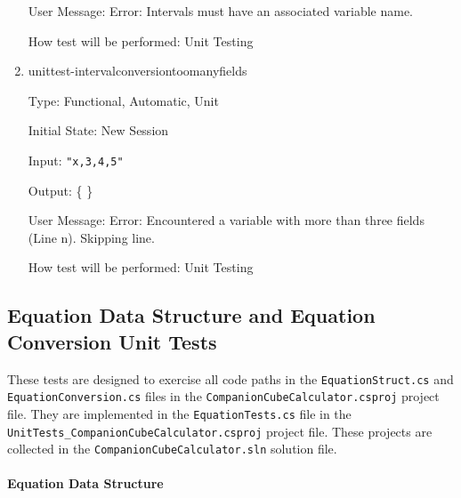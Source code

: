 \documentclass[12pt, titlepage]{article}
\begin{document}
\begin{enumerate}
	User Message: Error: Intervals must have an associated variable name.
	
	How test will be performed: Unit Testing\\
	
	\item{unittest-intervalconversiontoomanyfields}
	
	Type: Functional, Automatic, Unit
	
	Initial State: New Session
	
	Input: \texttt{"x,3,4,5"}
	
	Output: \{   \}
	
	User Message: Error: Encountered a variable with more than three fields 
	(Line n). Skipping line.
	
	How test will be performed: Unit Testing\\
	
\end{enumerate}

\subsection{Equation Data Structure and Equation Conversion Unit Tests}
These tests are designed to exercise all code paths in the 
\texttt{EquationStruct.cs} and \texttt{EquationConversion.cs} 
files in the \texttt{CompanionCubeCalculator.csproj} project file. They are 
implemented in the \texttt{EquationTests.cs} file in the \\
\texttt{UnitTests\_CompanionCubeCalculator.csproj} project file. These projects 
are collected in the \texttt{CompanionCubeCalculator.sln} solution file.

\paragraph{Equation Data Structure}
\end{document}
